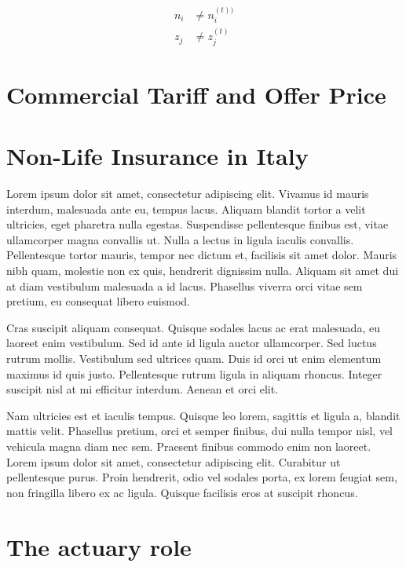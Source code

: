 \documentclass[a4paper, nobind]{templates/ociamthesis}
\theoremstyle{definition}
\theoremstyle{definition}
\theoremstyle{definition}
\theoremstyle{remark}
\begin{document}
\begin{align*}
n_i & \ne n_i^{(t))} \\
z_j & \ne z_j^{(t)}
\end{align*}

\hypertarget{commercial-tariff-and-offer-price}{%
\section{Commercial Tariff and Offer Price}\label{commercial-tariff-and-offer-price}}

\newpage

\hypertarget{non-life-insurance-in-italy}{%
\section{Non-Life Insurance in Italy}\label{non-life-insurance-in-italy}}

Lorem ipsum dolor sit amet, consectetur adipiscing elit. Vivamus id mauris interdum, malesuada ante eu, tempus lacus. Aliquam blandit tortor a velit ultricies, eget pharetra nulla egestas. Suspendisse pellentesque finibus est, vitae ullamcorper magna convallis ut. Nulla a lectus in ligula iaculis convallis. Pellentesque tortor mauris, tempor nec dictum et, facilisis sit amet dolor. Mauris nibh quam, molestie non ex quis, hendrerit dignissim nulla. Aliquam sit amet dui at diam vestibulum malesuada a id lacus. Phasellus viverra orci vitae sem pretium, eu consequat libero euismod.

Cras suscipit aliquam consequat. Quisque sodales lacus ac erat malesuada, eu laoreet enim vestibulum. Sed id ante id ligula auctor ullamcorper. Sed luctus rutrum mollis. Vestibulum sed ultrices quam. Duis id orci ut enim elementum maximus id quis justo. Pellentesque rutrum ligula in aliquam rhoncus. Integer suscipit nisl at mi efficitur interdum. Aenean et orci elit.

Nam ultricies est et iaculis tempus. Quisque leo lorem, sagittis et ligula a, blandit mattis velit. Phasellus pretium, orci et semper finibus, dui nulla tempor nisl, vel vehicula magna diam nec sem. Praesent finibus commodo enim non laoreet. Lorem ipsum dolor sit amet, consectetur adipiscing elit. Curabitur ut pellentesque purus. Proin hendrerit, odio vel sodales porta, ex lorem feugiat sem, non fringilla libero ex ac ligula. Quisque facilisis eros at suscipit rhoncus.

\hypertarget{the-actuary-role}{%
\section{The actuary role}\label{the-actuary-role}}
\end{document}
